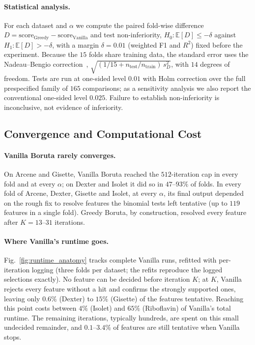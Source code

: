 \documentclass[runningheads]{llncs}
\begin{document}
\paragraph{Statistical analysis.} For each dataset and $\alpha$ we compute the paired fold-wise difference $D=\text{score}_{\text{Greedy}}-\text{score}_{\text{Vanilla}}$ and test non-inferiority, $H_0\colon \mathbb{E}[D]\le-\delta$ against $H_1\colon\mathbb{E}[D]>-\delta$, with a margin $\delta=0.01$ (weighted F1 and $R^2$) fixed before the experiment. Because the $15$ folds share training data, the standard error uses the Nadeau--Bengio correction~\cite{nadeau2003inference}, $\sqrt{(1/15+n_{\text{test}}/n_{\text{train}})\,s_D^2}$, with $14$ degrees of freedom. Tests are run at one-sided level $0.01$ with Holm correction over the full prespecified family of $165$ comparisons; as a sensitivity analysis we also report the conventional one-sided level $0.025$. Failure to establish non-inferiority is inconclusive, not evidence of inferiority.

\subsection{Convergence and Computational Cost}
\label{sec:experiments:cost}

\paragraph{Vanilla Boruta rarely converges.} On Arcene and Gisette, Vanilla Boruta reached the $512$-iteration cap in every fold and at every $\alpha$; on Dexter and Isolet it did so in $47$--$93\%$ of folds. In every fold of Arcene, Dexter, Gisette and Isolet, at every $\alpha$, its final output depended on the rough fix to resolve features the binomial tests left tentative (up to $119$ features in a single fold). Greedy Boruta, by construction, resolved every feature after $K=13$--$31$ iterations.

\paragraph{Where Vanilla's runtime goes.} Fig.~\ref{fig:runtime_anatomy} tracks complete Vanilla runs, refitted with per-iteration logging (three folds per dataset; the refits reproduce the logged selections exactly). No feature can be decided before iteration $K$; at $K$, Vanilla rejects every feature without a hit and confirms the strongly supported ones, leaving only $0.6\%$ (Dexter) to $15\%$ (Gisette) of the features tentative. Reaching this point costs between $4\%$ (Isolet) and $65\%$ (Riboflavin) of Vanilla's total runtime. The remaining iterations, typically hundreds, are spent on this small undecided remainder, and $0.1$--$3.4\%$ of features are still tentative when Vanilla stops.
\end{document}
